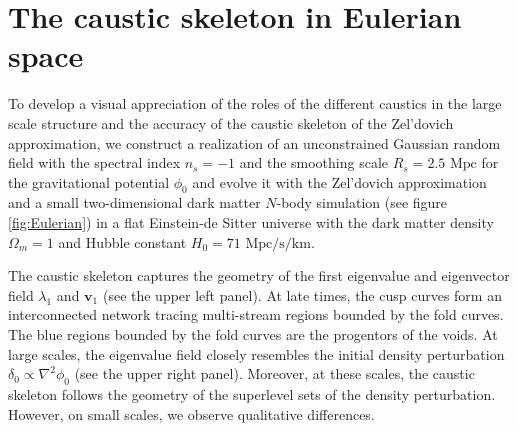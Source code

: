 \documentclass[a4paper, 11pt]{article}
\begin{document}
\section{The caustic skeleton in Eulerian space}\label{sec:Eulerian_space}
To develop a visual appreciation of the roles of the different caustics in the large scale structure and the accuracy of the caustic skeleton of the Zel'dovich approximation, we construct a realization of an unconstrained Gaussian random field with the spectral index $n_s=-1$ and the smoothing scale $R_s=2.5 \text{ Mpc}$ for the gravitational potential $\phi_0$ and evolve it with the Zel'dovich approximation and a small two-dimensional dark matter $N$-body simulation \cite{Hidding:2020} (see figure \ref{fig:Eulerian}) in a flat Einstein-de Sitter universe with the dark matter density $\Omega_m=1$ and Hubble constant $H_0=71\text{ Mpc/s/km}$. 

The caustic skeleton captures the geometry of the first eigenvalue and eigenvector field $\lambda_1$ and $\bm{v}_1$ (see the upper left panel). At late times, the cusp curves form an interconnected network tracing multi-stream regions bounded by the fold curves. The blue regions bounded by the fold curves are the progentors of the voids. At large scales, the eigenvalue field closely resembles the initial density perturbation $\delta_0 \propto \nabla^2\phi_0$ (see the upper right panel). Moreover, at these scales, the caustic skeleton follows the geometry of the superlevel sets of the density perturbation. However, on small scales, we observe qualitative differences. 
\end{document}
